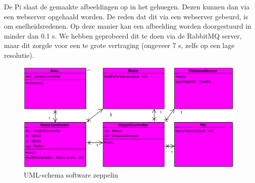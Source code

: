 \documentclass[eind]{penoverslag}
\begin{document}
De Pi slaat de gemaakte afbeeldingen op in het gehuegen. Dezen kunnen dan via een webserver opgehaald worden. De reden dat dit via een webserver gebeurd, is om snelheidsredenen. Op deze manier kan een afbeelding worden doorgestuurd in minder dan 0.1 s. We hebben geprobeerd dit te doen via de RabbitMQ server, maar dit zorgde voor een te grote vertraging (ongeveer 7 s, zelfs op een lage resolutie). \\

\begin{figure}[H]
\begin{center}
\includegraphics[width=\textwidth]{classdiagrampeno2.png}
\end{center}
\caption{UML-schema software zeppelin}
\label{softwareZeppelin}
\end{figure}
\end{document}
